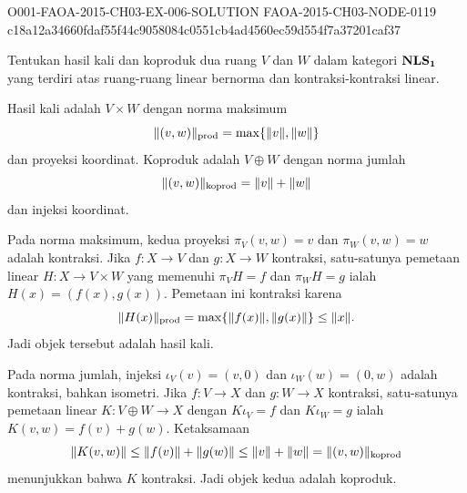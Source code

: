 \begin{o001solution}
  {O001-FAOA-2015-CH03-EX-006-SOLUTION}
  {FAOA-2015-CH03-NODE-0119}
  {c18a12a34660fdaf55f44c9058084c0551cb4ad4560ec59d554f7a37201caf37}
\begin{o001statement}
Tentukan hasil kali dan koproduk dua ruang $V$ dan $W$ dalam kategori
$\mathbf{NLS_{\mathbf{1}}}$ yang terdiri atas ruang-ruang linear bernorma dan kontraksi-kontraksi linear.
\end{o001statement}
\begin{o001answer}
Hasil kali adalah $V\times W$ dengan norma maksimum
\[
\lVert(v,w)\rVert_{\mathrm{prod}}=\max\{\lVert v\rVert,\lVert w\rVert\}
\]
dan proyeksi koordinat. Koproduk adalah $V\oplus W$ dengan norma jumlah
\[
\lVert(v,w)\rVert_{\mathrm{koprod}}=\lVert v\rVert+\lVert w\rVert
\]
dan injeksi koordinat.
\end{o001answer}
\begin{o001proof}
Pada norma maksimum, kedua proyeksi
$\pi_V(v,w)=v$ dan $\pi_W(v,w)=w$ adalah kontraksi. Jika
$f\colon X\to V$ dan $g\colon X\to W$ kontraksi, satu-satunya pemetaan
linear $H\colon X\to V\times W$ yang memenuhi
$\pi_VH=f$ dan $\pi_WH=g$ ialah $H(x)=(f(x),g(x))$. Pemetaan ini kontraksi
karena
\[
\lVert H(x)\rVert_{\mathrm{prod}}
=\max\{\lVert f(x)\rVert,\lVert g(x)\rVert\}\le\lVert x\rVert.
\]
Jadi objek tersebut adalah hasil kali.

Pada norma jumlah, injeksi
$\iota_V(v)=(v,0)$ dan $\iota_W(w)=(0,w)$ adalah kontraksi, bahkan isometri.
Jika $f\colon V\to X$ dan $g\colon W\to X$ kontraksi, satu-satunya pemetaan
linear $K\colon V\oplus W\to X$ dengan
$K\iota_V=f$ dan $K\iota_W=g$ ialah
$K(v,w)=f(v)+g(w)$. Ketaksamaan
\[
\lVert K(v,w)\rVert
\le\lVert f(v)\rVert+\lVert g(w)\rVert
\le\lVert v\rVert+\lVert w\rVert
=\lVert(v,w)\rVert_{\mathrm{koprod}}
\]
menunjukkan bahwa $K$ kontraksi. Jadi objek kedua adalah koproduk.
\end{o001proof}
\end{o001solution}

